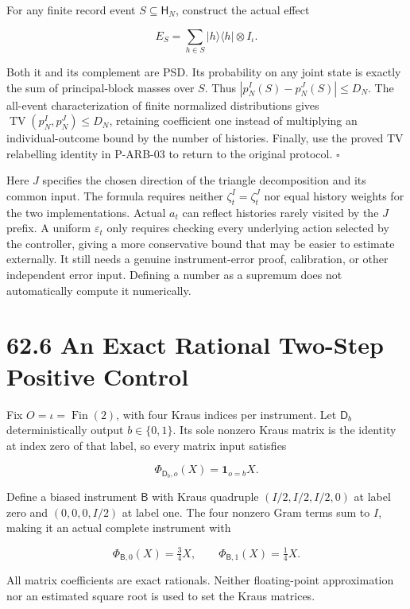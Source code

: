 \documentclass[
  11pt,
  oneside]{book}
\begin{document}
For any finite record event \(S\subseteq\mathsf H_N\), construct the
actual effect

\[
E_S=\sum_{h\in S}|h\rangle\langle h|\otimes I_\iota.
\]

Both it and its complement are PSD. Its probability on any joint state
is exactly the sum of principal-block masses over \(S\). Thus
\(|p^I_N(S)-p^J_N(S)|\le D_N\). The all-event characterization of finite
normalized distributions gives
\(\operatorname{TV}(p^I_N,p^J_N)\le D_N\), retaining coefficient one
instead of multiplying an individual-outcome bound by the number of
histories. Finally, use the proved TV relabelling identity in P-ARB-03
to return to the original protocol. \(\square\)

Here \(J\) specifies the chosen direction of the triangle decomposition
and its common input. The formula requires neither
\(\zeta^I_t=\zeta^J_t\) nor equal history weights for the two
implementations. Actual \(a_t\) can reflect histories rarely visited by
the \(J\) prefix. A uniform \(\varepsilon_t\) only requires checking
every underlying action selected by the controller, giving a more
conservative bound that may be easier to estimate externally. It still
needs a genuine instrument-error proof, calibration, or other
independent error input. Defining a number as a supremum does not
automatically compute it numerically.

\section{62.6 An Exact Rational Two-Step Positive Control}

Fix \(O=\iota=\operatorname{Fin}(2)\), with four Kraus indices per
instrument. Let \(\mathsf D_b\) deterministically output
\(b\in\{0,1\}\). Its sole nonzero Kraus matrix is the identity at index
zero of that label, so every matrix input satisfies

\[
\Phi_{\mathsf D_b,o}(X)=\mathbf1_{o=b}X.
\]

Define a biased instrument \(\mathsf B\) with Kraus quadruple
\((I/2,I/2,I/2,0)\) at label zero and \((0,0,0,I/2)\) at label one. The
four nonzero Gram terms sum to \(I\), making it an actual complete
instrument with

\[
\Phi_{\mathsf B,0}(X)=\tfrac34X,
\qquad \Phi_{\mathsf B,1}(X)=\tfrac14X.
\]

All matrix coefficients are exact rationals. Neither floating-point
approximation nor an estimated square root is used to set the Kraus
matrices.
\end{document}
